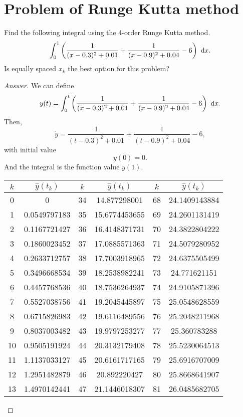 \section{Problem of Runge Kutta method}
Find the following integral using the 4-order Runge Kutta method.
\[ \int_{0}^{1}\left(\frac{1}{(x-0.3)^2+0.01}+\frac{1}{(x-0.9)^2+0.04}-6\right)~\mathrm{d} x. \]
Is equally spaced \(x_k\) the best option for this problem?
\begin{proof}[Answer]
We can define
\[ y(t)=\int_{0}^{t}\left(\frac{1}{(x-0.3)^2+0.01}+\frac{1}{(x-0.9)^2+0.04}-6\right)~\mathrm{d} x. \]
Then,
\[ \dot{y}=\frac{1}{(t-0.3)^2+0.01}+\frac{1}{(t-0.9)^2+0.04}-6, \]
with initial value
\[ y(0)=0. \]
And the integral is the function value \(y(1)\).
\ifnum{}
	\begin{table}[H]
\else
	\begin{table}[htbp]
\fi
	\centering
	\begin{tabular}{|c|c|c|c|c|c|}
	\hline
		\(k\)	&	\(\hat{y}(t_k)\)	&	\(k\)	&	\(\hat{y}(t_k)\)	&	\(k\)	&	\(\hat{y}(t_k)\)	\\	\hline
		0	&	0				&	34	&	14.877298001	&	68	&	24.1409143884	\\	\hline
		1	&	0.0549797183	&	35	&	15.6774453655	&	69	&	24.2601131419	\\	\hline
		2	&	0.1167721427	&	36	&	16.4148371731	&	70	&	24.3822804222	\\	\hline
		3	&	0.1860023452	&	37	&	17.0885571363	&	71	&	24.5079280952	\\	\hline
		4	&	0.2633712757	&	38	&	17.7003918965	&	72	&	24.6375505499	\\	\hline
		5	&	0.3496668534	&	39	&	18.2538982241	&	73	&	24.771621151	\\	\hline
		6	&	0.4457768536	&	40	&	18.7536264937	&	74	&	24.9105871396	\\	\hline
		7	&	0.5527038756	&	41	&	19.2045445897	&	75	&	25.0548628559	\\	\hline
		8	&	0.6715826983	&	42	&	19.6116489556	&	76	&	25.2048211968	\\	\hline
		9	&	0.8037003482	&	43	&	19.9797253277	&	77	&	25.360783288	\\	\hline
		10	&	0.9505191924	&	44	&	20.3132179408	&	78	&	25.5230064513	\\	\hline
		11	&	1.1137033127	&	45	&	20.6161717165	&	79	&	25.6916707009	\\	\hline
		12	&	1.2951482879	&	46	&	20.892220427	&	80	&	25.8668641907	\\	\hline
		13	&	1.4970142441	&	47	&	21.1446018307	&	81	&	26.0485682705	\\	\hline

\end{tabular}
\end{table}
\end{table}
\end{proof}
